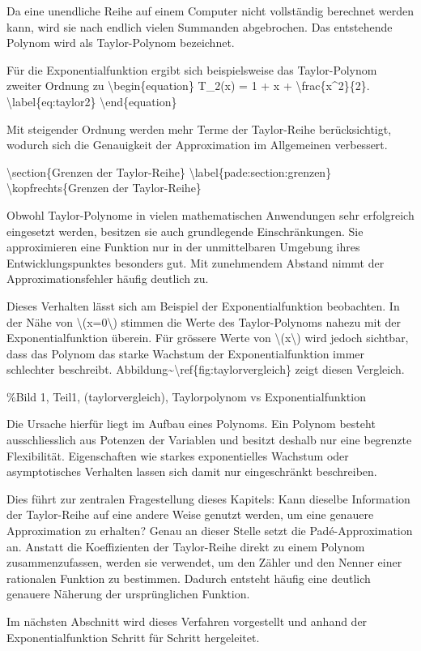 Da eine unendliche Reihe auf einem Computer nicht vollständig berechnet
werden kann, wird sie nach endlich vielen Summanden abgebrochen. Das
entstehende Polynom wird als Taylor-Polynom bezeichnet.

Für die Exponentialfunktion ergibt sich beispielsweise das
Taylor-Polynom zweiter Ordnung zu \textbackslash begin\{equation\}
T\_2(x) = 1 + x + \textbackslash frac\{x\^{}2\}\{2\}.
\textbackslash label\{eq:taylor2\} \textbackslash end\{equation\}

Mit steigender Ordnung werden mehr Terme der Taylor-Reihe
berücksichtigt, wodurch sich die Genauigkeit der Approximation im
Allgemeinen verbessert.

\textbackslash section\{Grenzen der Taylor-Reihe\}
\textbackslash label\{pade:section:grenzen\}
\textbackslash kopfrechts\{Grenzen der Taylor-Reihe\}

Obwohl Taylor-Polynome in vielen mathematischen Anwendungen sehr
erfolgreich eingesetzt werden, besitzen sie auch grundlegende
Einschränkungen. Sie approximieren eine Funktion nur in der
unmittelbaren Umgebung ihres Entwicklungspunktes besonders gut. Mit
zunehmendem Abstand nimmt der Approximationsfehler häufig deutlich zu.

Dieses Verhalten lässt sich am Beispiel der Exponentialfunktion
beobachten. In der Nähe von \textbackslash(x=0\textbackslash) stimmen
die Werte des Taylor-Polynoms nahezu mit der Exponentialfunktion
überein. Für grössere Werte von \textbackslash(x\textbackslash) wird
jedoch sichtbar, dass das Polynom das starke Wachstum der
Exponentialfunktion immer schlechter beschreibt.
Abbildung\textasciitilde\textbackslash ref\{fig:taylorvergleich\} zeigt
diesen Vergleich.

\%Bild 1, Teil1, (taylorvergleich), Taylorpolynom vs Exponentialfunktion

Die Ursache hierfür liegt im Aufbau eines Polynoms. Ein Polynom besteht
ausschliesslich aus Potenzen der Variablen und besitzt deshalb nur eine
begrenzte Flexibilität. Eigenschaften wie starkes exponentielles
Wachstum oder asymptotisches Verhalten lassen sich damit nur
eingeschränkt beschreiben.

Dies führt zur zentralen Fragestellung dieses Kapitels: Kann dieselbe
Information der Taylor-Reihe auf eine andere Weise genutzt werden, um
eine genauere Approximation zu erhalten? Genau an dieser Stelle setzt
die Padé-Approximation an. Anstatt die Koeffizienten der Taylor-Reihe
direkt zu einem Polynom zusammenzufassen, werden sie verwendet, um den
Zähler und den Nenner einer rationalen Funktion zu bestimmen. Dadurch
entsteht häufig eine deutlich genauere Näherung der ursprünglichen
Funktion.

Im nächsten Abschnitt wird dieses Verfahren vorgestellt und anhand der
Exponentialfunktion Schritt für Schritt hergeleitet.
